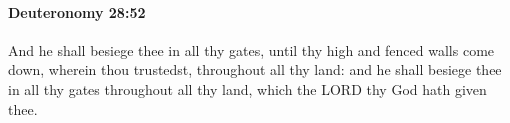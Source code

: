 
		\paragraph{Deuteronomy 28:52} %
			\label{DEUTERONOMY-28-52}

			And he shall besiege thee in all thy gates, until thy high and fenced walls come down, wherein thou trustedst, throughout all thy land: and he shall besiege thee in all thy gates throughout all thy land, which the LORD thy God hath given thee.


